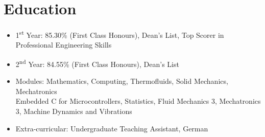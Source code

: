 \documentclass{cv}
\begin{document}
\section{Education}
\begin{subsections}
    \subtitle{MEng Mechanical Engineering \hfill London, United Kingdom}
    \begin{itemize}
        \item 1\textsuperscript{st} Year: 85.30\% (First Class Honours), Dean's List, Top Scorer in Professional Engineering Skills
        \item 2\textsuperscript{nd} Year: 84.55\% (First Class Honours), Dean's List
        \item Modules: Mathematics, Computing, Thermofluids, Solid Mechanics, Mechatronics \\ Embedded C for Microcontrollers, Statistics, Fluid Mechanics 3, Mechatronics 3, Machine Dynamics and Vibrations
        \item Extra-curricular: Undergraduate Teaching Assistant, German
    \end{itemize}
\end{subsections}
\end{document}
